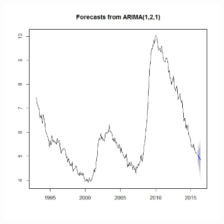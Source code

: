 \documentclass[twoside,twocolumn]{article}
\begin{document}
\begin{figure}[htb]
     	\includegraphics[width=.9\linewidth]{images/fore4}
 \end{figure}
\end{document}
